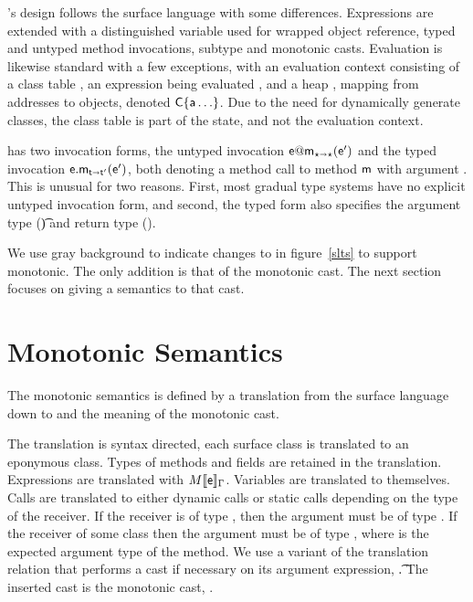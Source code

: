 \documentclass[sigconf]{acmart}
\begin{document}
\kafka's design follows the surface language with some differences.
Expressions are extended with \that a distinguished variable used for
wrapped object reference, typed and untyped method invocations, subtype and
monotonic casts.  Evaluation is likewise standard with a few exceptions,
with an evaluation context consisting of a class table \K, an expression
being evaluated \e, and a heap \s, mapping from addresses \a to objects,
denoted $\C\{\a\ldots\}$. Due to the need for dynamically generate classes,
the class table \K is part of the state, and not the evaluation context.

\kafka has two invocation forms, the untyped invocation $\DynCall\e\m\ep$
and the typed invocation $\KCall\e\m\ep{\t}{\tp}$, both denoting a method
call to method ${\sf{m}}$ with argument \ep. This is unusual for two
reasons. First, most gradual type systems have no explicit untyped
invocation form, and second, the typed form also specifies the argument type
(\t) and return type (\tp).

We use gray background to indicate changes to \kafka in figure~\ref{slts} to
support monotonic. The only addition is that of the monotonic cast. The next
section focuses on giving a semantics to that cast.


\section{Monotonic Semantics}

The monotonic semantics is defined by a translation from the surface
language down to \kafka and the meaning of the monotonic cast. 

The translation is syntax directed, each surface class is translated to an
eponymous \kafka class. Types of methods and fields are retained in the
translation. Expressions are translated with $\TRG[M]{\e}\Env$. Variables
are translated to themselves. Calls are translated to either dynamic calls
or static calls depending on the type of the receiver.  If the receiver is
of type \any, then the argument must be of type \any. If the receiver of
some class \C then the argument must be of type \D, where \D is the expected
argument type of the method.  We use a variant of the translation relation
that performs a cast if necessary on its argument expression,
\TAG[M]{\e}{\Env}\t.  The inserted cast is the monotonic cast,
\MonCast{\t}{\ep}.
\end{document}
